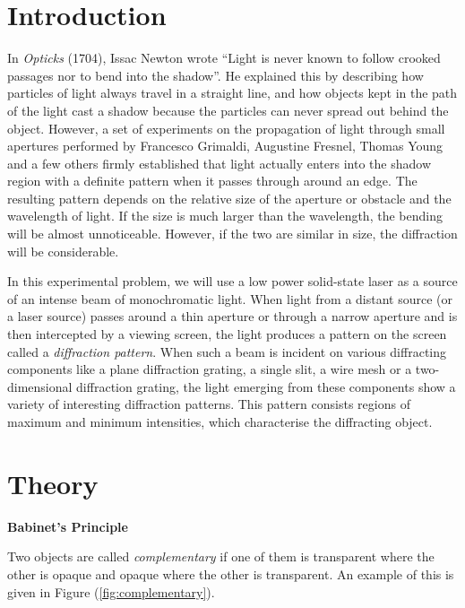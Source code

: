 \begin{refsection}
\section*{Introduction}
	 
In \textit{Opticks} (1704), Issac Newton wrote ``Light is never known to follow crooked passages nor to bend into the shadow''. He explained this by describing how particles of light always travel in a straight line, and how objects kept in the path of the light cast a shadow because the particles can never spread out behind the object. However, a set of experiments on the propagation of light through small apertures performed by Francesco Grimaldi, Augustine Fresnel, Thomas Young and a few others firmly established that light actually enters into the shadow region with a definite pattern when it passes through around an edge. The resulting pattern depends on the relative size of the aperture or obstacle and the wavelength of light. If the size is much larger than the wavelength, the bending will be almost unnoticeable. However, if the two are similar in size, the diffraction will be considerable.    
     
In this experimental problem, we will use a low power solid-state laser as a source of an intense beam of monochromatic light. When light from a distant source (or a laser source) passes around a thin aperture or through a narrow aperture and is then intercepted by a viewing screen, the light produces a pattern on the screen called a \textit{diffraction pattern}. When such a beam is incident on various diffracting components like a plane diffraction grating, a single slit, a wire mesh or a two-dimensional diffraction grating, the light emerging from these components show a variety of interesting diffraction patterns. This pattern consists regions of maximum and minimum intensities, which characterise the diffracting object. 

\section*{Theory}


\begin{imp}

\begin{center}
    \textbf{Babinet's Principle}
\end{center}

Two objects are called \textit{complementary} if one of them is transparent where the other is opaque and opaque where the other is transparent. An example of this is given in Figure (\ref{fig:complementary}).


\end{imp}
\end{refsection}
